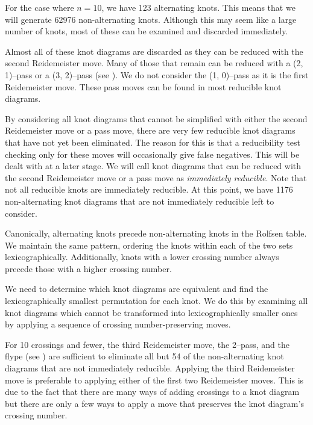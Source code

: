 \begin{paper}
For the case where $n=10$, we have 123 alternating knots.
This means that we will generate 62976 non-alternating knots.
Although this may seem like a large number of knots, most of these can be
examined and discarded immediately.

Almost all of these knot diagrams are discarded as they can be reduced with the
second Reidemeister move.
Many of those that remain can be reduced with a (2, 1)--pass or a (3, 2)--pass
(see \figMoves).
We do not consider the (1, 0)--pass as it is the first Reidemeister move.
These pass moves can be found in most reducible knot diagrams.


By considering all knot diagrams that cannot be simplified with either the
second Reidemeister move or a pass move, there are very few reducible knot
diagrams that have not yet been eliminated.
The reason for this is that a reducibility test checking only for these moves
will occasionally give false negatives.
This will be dealt with at a later stage.
We will call knot diagrams that can be reduced with the second Reidemeister move
or a pass move as \textit{immediately reducible}.
Note that not all reducible knots are immediately reducible.
At this point, we have 1176 non-alternating knot diagrams that are not
immediately reducible left to consider.



Canonically, alternating knots precede non-alternating knots in the Rolfsen
table.
We maintain the same pattern, ordering the knots within each of the two sets
lexicographically.
Additionally, knots with a lower crossing number always precede those with a
higher crossing number.


We need to determine which knot diagrams are equivalent and find the
lexicographically smallest permutation for each knot.
We do this by examining all knot diagrams which cannot be transformed into
lexicographically smaller ones by applying a sequence of crossing
number-preserving moves.

For 10 crossings and fewer, the third Reidemeister move, the 2--pass, and the
flype (see \figMoves) are sufficient to eliminate all but 54 of the
non-alternating knot diagrams that are not immediately reducible.
Applying the third Reidemeister move is preferable to applying either of the
first two Reidemeister moves.
This is due to the fact that there are many ways of adding crossings to a knot
diagram but there are only a few ways to apply a move that preserves the knot
diagram's crossing number.


\end{paper}
